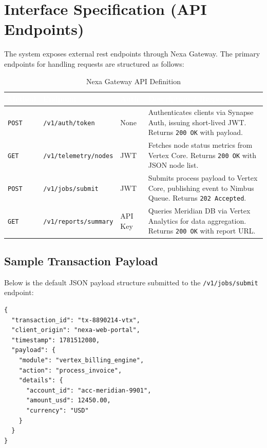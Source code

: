 \section{Interface Specification (API Endpoints)}
The system exposes external rest endpoints through Nexa Gateway. The primary endpoints for handling requests are structured as follows:

\begin{table}[h]
\centering
\sffamily\small
\begin{tabularx}{\linewidth}{|l|l|l|X|}
\hline
\rowcolor{primary}
\textcolor{white}{\textbf{Method}} & \textcolor{white}{\textbf{Endpoint}} & \textcolor{white}{\textbf{Auth}} & \textcolor{white}{\textbf{Description / Response}} \\
\hline
\texttt{POST} & \texttt{/v1/auth/token} & None & Authenticates clients via Synapse Auth, issuing short-lived JWT. Returns \texttt{200 OK} with payload. \\
\hline
\rowcolor{lightbg}
\texttt{GET} & \texttt{/v1/telemetry/nodes} & JWT & Fetches node status metrics from Vertex Core. Returns \texttt{200 OK} with JSON node list. \\
\hline
\texttt{POST} & \texttt{/v1/jobs/submit} & JWT & Submits process payload to Vertex Core, publishing event to Nimbus Queue. Returns \texttt{202 Accepted}. \\
\hline
\rowcolor{lightbg}
\texttt{GET} & \texttt{/v1/reports/summary} & API Key & Queries Meridian DB via Vertex Analytics for data aggregation. Returns \texttt{200 OK} with report URL. \\
\hline
\end{tabularx}
\caption{Nexa Gateway API Definition}
\end{table}

\subsection{Sample Transaction Payload}
Below is the default JSON payload structure submitted to the \texttt{/v1/jobs/submit} endpoint:

\begin{lstlisting}[caption=Transaction Request JSON Payload]
{
  "transaction_id": "tx-8890214-vtx",
  "client_origin": "nexa-web-portal",
  "timestamp": 1781512080,
  "payload": {
    "module": "vertex_billing_engine",
    "action": "process_invoice",
    "details": {
      "account_id": "acc-meridian-9901",
      "amount_usd": 12450.00,
      "currency": "USD"
    }
  }
}
\end{lstlisting}
